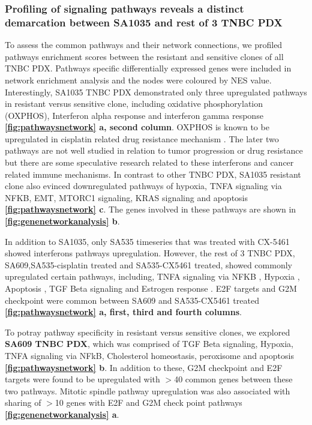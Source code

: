 \subsubsection{Profiling of signaling pathways reveals a distinct demarcation between SA1035 and rest of 3 TNBC PDX}
To assess the common pathways and their network connections, 
we profiled pathways enrichment scores between the resistant and sensitive clones of all TNBC PDX. 
Pathways specific differentially expressed genes were included in network enrichment analysis and the nodes were coloured by NES value. Interestingly, SA1035 TNBC PDX demonstrated only three upregulated pathways in resistant versus sensitive clone, including oxidative phosphorylation (OXPHOS), Interferon alpha response \cite{provance2019deciphering} and interferon gamma response \cite{mojic2018dark} \textbf{\autoref{fig:pathwaysnetwork} a, second column}. \ac{OXPHOS} is known to be upregulated in cisplatin related drug resistance mechanism \cite{lee2017myc}. The later two pathways are not well studied in relation to tumor progression or drug resistance but there are some speculative research related to these interferons and cancer related immune mechanisms. In contrast to other TNBC PDX, SA1035 resistant clone also evinced downregulated pathways of hypoxia, TNFA signaling via NFKB, \ac{EMT}, MTORC1 signaling, KRAS signaling and apoptosis {\textbf{\autoref{fig:pathwaysnetwork} c}}. The genes involved in these pathways are shown in \textbf{\autoref{fig:genenetworkanalysis} b}.

In addition to SA1035, only SA535 timeseries that was treated with CX-5461 showed interferons pathways upregulation. However, the rest of 3 TNBC PDX, SA609,SA535-cisplatin treated and SA535-CX5461 treated, showed commonly upregulated certain pathways, including, TNFA signaling via NFKB \cite{lagunas2008nuclear,ito2015down, ryan2019targeting}, Hypoxia \cite{lee2012hypoxia, mcevoy2015identifying, deben2018hypoxia,li2019erk}, Apoptosis \cite{panaretakis2012cisplatin}, TGF Beta signaling \cite{zhang2019tgfbeta1} and Estrogen response \cite{zhu2018er}. E2F targets \cite{zheng2020upregulation} and G2M checkpoint \cite{visconti2016cell} were common between SA609 and SA535-CX5461 treated \textbf{\autoref{fig:pathwaysnetwork} a, first, third and fourth columns}. 

To potray pathway specificity in resistant versus sensitive clones, we explored \textbf{SA609 TNBC PDX}, which was  comprised of TGF Beta signaling, Hypoxia, TNFA signaling via NFkB, Cholesterol homeostasis, peroxisome and apoptosis \textbf{\autoref{fig:pathwaysnetwork} b}. In addition to these, G2M checkpoint and E2F targets were found to be upregulated with $>$40 common genes between these two pathways. Mitotic spindle pathway upregulation was also associated with sharing of $>$10 genes with E2F and G2M check point pathways \textbf{\autoref{fig:genenetworkanalysis} a}.

